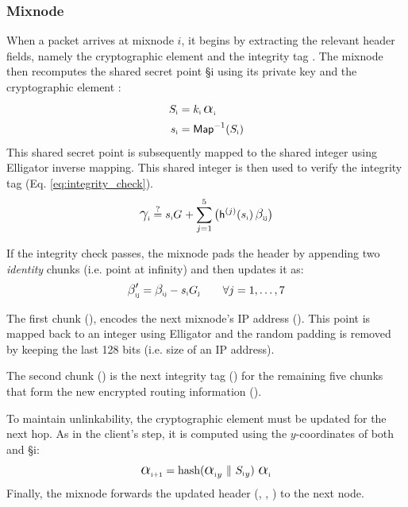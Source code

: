 \subsubsection{Mixnode}

When a packet arrives at mixnode $i$, it begins by extracting the relevant header fields, namely the cryptographic element  and the integrity tag .  
The mixnode then recomputes the shared secret point \S{i} using its private key  and the cryptographic element :  
\begin{equation}
\begin{aligned}
    \S{i} &= \sk{i} \, \A{i} \\
    \s{i} &= \InverseMap{\S{i}}\\
\end{aligned}
\label{eq:derive_secret}
\end{equation}
This shared secret point is subsequently mapped to the shared integer  using Elligator inverse mapping.
This shared integer is then used to verify the integrity tag (Eq. \ref{eq:integrity_check}).
\begin{equation}
\C{i} \overset{\text{?}}{=} \sG{i}{} + \sum_{j=1}^{5} \big( \hashIt{\s{i}}{j} \, \B{i}{j} \big)
\label{eq:integrity_check}
\end{equation}

\noindent If the integrity check passes, the mixnode pads the header by appending two \textit{identity} chunks (i.e. point at infinity) and then updates it as:
\begin{equation}
{\BB{i}{j}} = \B{i}{j} - \sG{i}{j} \qquad \forall j = 1, \dots, 7
\label{eq:decrypt}
\end{equation}

The first chunk ({}), encodes the next mixnode’s IP address (). 
This point is mapped back to an integer using Elligator and the random padding is removed by keeping the last 128 bits (i.e. size of an IP address).

\noindent The second chunk ({}) is the next integrity tag () for the remaining five chunks that form the new encrypted routing information ().

To maintain unlinkability, the cryptographic element  must be updated for the next hop. 
As in the client's step, it is computed using the $y$-coordinates of both  and \S{i}:
\begin{equation}
\A{i+1} = \text{hash}({\A{i}}_y \ \| \ {\S{i}}_y) \ \A{i}
\label{eq:update_alpha}
\end{equation}
Finally, the mixnode forwards the updated header (, , ) to the next node.

